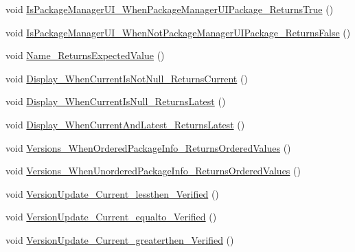 \begin{DoxyCompactItemize}
void \mbox{\hyperlink{class_unity_editor_1_1_package_manager_1_1_u_i_1_1_tests_1_1_package_tests_abd0f7fe40ee28a53004af7d1f36d3659}{Is\+Package\+Manager\+U\+I\+\_\+\+When\+Package\+Manager\+U\+I\+Package\+\_\+\+Returns\+True}} ()
\item 
void \mbox{\hyperlink{class_unity_editor_1_1_package_manager_1_1_u_i_1_1_tests_1_1_package_tests_a48b8d614c482ec4b8300b756c81e7dfc}{Is\+Package\+Manager\+U\+I\+\_\+\+When\+Not\+Package\+Manager\+U\+I\+Package\+\_\+\+Returns\+False}} ()
\item 
void \mbox{\hyperlink{class_unity_editor_1_1_package_manager_1_1_u_i_1_1_tests_1_1_package_tests_aab1f3d3f1e2518ca2c48acb9234932c6}{Name\+\_\+\+Returns\+Expected\+Value}} ()
\item 
void \mbox{\hyperlink{class_unity_editor_1_1_package_manager_1_1_u_i_1_1_tests_1_1_package_tests_ad75497ae6dce53d4545ea4b4b249371c}{Display\+\_\+\+When\+Current\+Is\+Not\+Null\+\_\+\+Returns\+Current}} ()
\item 
void \mbox{\hyperlink{class_unity_editor_1_1_package_manager_1_1_u_i_1_1_tests_1_1_package_tests_a0e7e900706dbdb75e080ad1067b4d080}{Display\+\_\+\+When\+Current\+Is\+Null\+\_\+\+Returns\+Latest}} ()
\item 
void \mbox{\hyperlink{class_unity_editor_1_1_package_manager_1_1_u_i_1_1_tests_1_1_package_tests_aa4081941d225974ef96ab9ee1199ed97}{Display\+\_\+\+When\+Current\+And\+Latest\+\_\+\+Returns\+Latest}} ()
\item 
void \mbox{\hyperlink{class_unity_editor_1_1_package_manager_1_1_u_i_1_1_tests_1_1_package_tests_afc24bc79019df27f2236af48e45e2e7e}{Versions\+\_\+\+When\+Ordered\+Package\+Info\+\_\+\+Returns\+Ordered\+Values}} ()
\item 
void \mbox{\hyperlink{class_unity_editor_1_1_package_manager_1_1_u_i_1_1_tests_1_1_package_tests_a0b76dc1142873b65a94b3b35ece7fd18}{Versions\+\_\+\+When\+Unordered\+Package\+Info\+\_\+\+Returns\+Ordered\+Values}} ()
\item 
void \mbox{\hyperlink{class_unity_editor_1_1_package_manager_1_1_u_i_1_1_tests_1_1_package_tests_ad707cd0a3a74d516f5dad859751ace0f}{Version\+Update\+\_\+\+Current\+\_\+lessthen\+\_\+\+Verified}} ()
\item 
void \mbox{\hyperlink{class_unity_editor_1_1_package_manager_1_1_u_i_1_1_tests_1_1_package_tests_aaa959599a501efe57024905ad279a612}{Version\+Update\+\_\+\+Current\+\_\+equalto\+\_\+\+Verified}} ()
\item 
void \mbox{\hyperlink{class_unity_editor_1_1_package_manager_1_1_u_i_1_1_tests_1_1_package_tests_a18fc2d3b764315a21f6a15bcdd40ece4}{Version\+Update\+\_\+\+Current\+\_\+greaterthen\+\_\+\+Verified}} ()

\end{DoxyCompactItemize}
